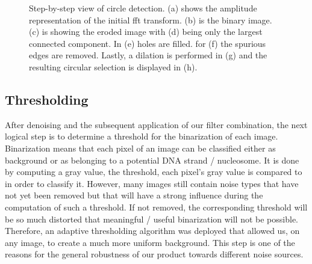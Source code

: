 \documentclass{article}
\begin{document}
\begin{figure}[!htb]
\begin{subfigure}[b]{0.24\textwidth}
                \caption{}
                \label{fig:mouse}
        \end{subfigure}
        \caption{Step-by-step view of circle detection. (a) shows the amplitude representation of the initial fft transform.
(b) is the binary image.
(c) is showing the eroded image with (d) being only the largest connected component.
In (e) holes are filled. for (f) the spurious edges are removed.
Lastly, a dilation is performed in (g) and the resulting circular selection is displayed in (h).}\label{fig:lowpass}
\end{figure}
\fi

\subsection{Thresholding}\label{sec:Thresholding}
After denoising and the subsequent application of our filter combination, the next logical step is to determine a threshold for the binarization of each image. Binarization means that each pixel of an image can be classified either as background or as belonging to a potential DNA strand / nucleosome. It is done by computing a gray value, the threshold, each pixel's gray value is compared to in order to classify it. However, many images still contain noise types that have not yet been removed but that will have a strong influence during the computation of such a threshold. If not removed, the corresponding threshold will be so much distorted that meaningful / useful binarization will not be possible.
Therefore, an adaptive thresholding algorithm was deployed that allowed us, on any image, to create a much more uniform background. This step is one of the reasons for the general robustness of our product towards different noise sources.
\end{document}
